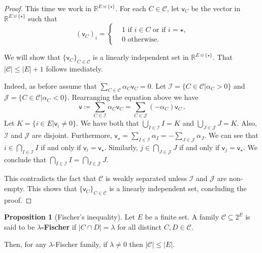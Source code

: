 \documentclass[12pt]{amsart}
\theoremstyle{definition}
\newtheorem{prop}[thm]{Proposition}
\newcommand{\R}{\mathbb{R}}
\newcommand{\CC}{\mathcal C}
\newcommand{\JJ}{\mathcal J}
\newcommand{\II}{\mathcal I}
\newcommand{\vv}{\mathsf{v}}
\begin{document}
\begin{proof}
This time we work in $\R^{E \uplus \{ \star \}}$.
For each $C \in \CC$, let $\vv_C$ be the vector in $\R^{E \uplus \{ \star \}}$ such that 
$$ (\vv_C)_i =\begin{cases*}
      & 1 \text{ if $i \in C$ or if $i = \star$,}\\
      & 0 \text{ otherwise.}
    \end{cases*} $$


We will show that $\{ \vv_C\}_{C\in \CC}$ is a linearly independent set in $\R^{E \uplus \{ \star \}}$.
That $|\CC| \leq |E|+1$ follows imediately.

Indeed, as before assume that $\sum_{C \in \CC} \alpha_C \vv_C = 0$.
Let $\II = \{C \in \CC | \alpha_C > 0\}$ and $\JJ = \{C \in \CC | \alpha_C < 0\}$.
Rearranging the equation above we have
$$\vv \coloneqq \sum_{C \in \II} \alpha_C \vv_C  = \sum_{C \in \JJ} (- \alpha_C) \vv_C\, .$$
Let $K = \{i \in E| \vv_i \neq 0\}$.
We have both that $\bigcup_{I\in\II} I = K$ and $\bigcup_{J\in\JJ} J = K$.
Also, $\II$ and $\JJ$ are disjoint.
Furthermore, $\vv_{\star } = \sum_{I \in \II} \alpha_I = - \sum_{J \in \JJ} \alpha_J$.
We can see that $i \in \bigcap_{I \in \II} I$ if and only if $\vv_i = \vv_{\star }$.
Similarly, $j \in \bigcap_{J \in \JJ} J$ if and only if $\vv_j = \vv_{\star }$.
We conclude that $\bigcap_{I \in \II} I = \bigcap_{J \in \JJ} J$.

This contradicts the fact that $\CC$ is weakly separated unless $\II$ and $\JJ$ are non-empty.
This shows that $ \{ \vv_C\}_{C\in \CC}$ is a linearly independent set, concluding the proof.
\end{proof}


\begin{prop}[Fischer's inequality]\label{prop:fischer}
Let $E$ be a finite set.
A family $\CC \subseteq 2^E$ is said to be $\lambda$\textbf{-Fischer} if $|C\cap D| = \lambda$ for all distinct $C, D \in \CC$.

Then, for any $\lambda$-Fischer family, if $\lambda \neq 0$ then $|\CC| \leq |E|$.
\end{prop}
\end{document}
